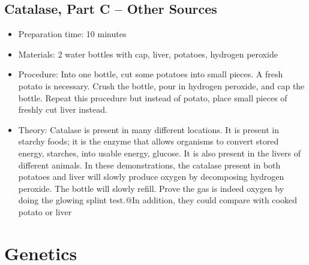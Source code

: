 \subsection{Catalase, Part C – Other Sources}
\begin{itemize}
\item{Preparation time: 10 minutes}
\item{Materials: 2 water bottles with cap, liver, potatoes, hydrogen peroxide}
\item{Procedure: Into one bottle, cut some potatoes into small pieces. A fresh potato is necessary. Crush the bottle, pour in hydrogen peroxide, and cap the bottle. Repeat this procedure but instead of potato, place small pieces of freshly cut liver instead. }
\item{Theory: Catalase is present in many different locations. It is present in starchy foods; it is the enzyme that allows organisms to convert stored energy, starches, into usable energy, glucose. It is also present in the livers of different animals. In these demonstrations, the catalase present in both potatoes and liver will slowly produce oxygen by decomposing hydrogen peroxide. The bottle will slowly refill. Prove the gas is indeed oxygen by doing the glowing splint test.@In addition, they could compare with cooked potato or liver}
\end{itemize}

\section{Genetics}
